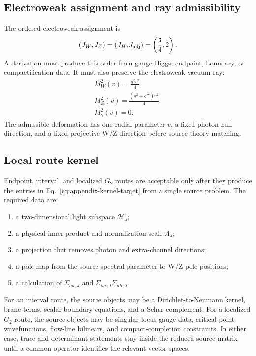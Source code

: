 \subsection{Electroweak assignment and ray admissibility}
\label{app:target-electroweak-assignment}
\label{app:target-electroweak-ray}

The ordered electroweak assignment is
\begin{equation}
  (J_W,J_Z)=(J_H,J_{\rm adj})=\left(\frac34,2\right).
  \label{eq:appendix-ew-assignment}
\end{equation}
A derivation must produce this order from gauge-Higgs, endpoint, boundary, or
compactification data.  It must also preserve the electroweak vacuum ray:
\begin{equation}
  \begin{gathered}
  M_W^2(v)=\frac{g^2v^2}{4},\\
  M_Z^2(v)=\frac{(g^2+g'^2)v^2}{4},\\
  M_\gamma^2(v)=0 .
  \end{gathered}
  \label{eq:appendix-ew-ray}
\end{equation}
The admissible deformation has one radial parameter \(v\), a fixed photon null
direction, and a fixed projective W/Z direction before source-theory matching.

\subsection{Local route kernel}
\label{app:target-boundary-determinant}
\label{app:target-g2-ade-pairing}

Endpoint, interval, and localized \(G_2\) routes are acceptable only after
they produce the entries in Eq.~\eqref{eq:appendix-kernel-target} from a
single source problem.  The required data are:
\begin{enumerate}
\item a two-dimensional light subspace \(\mathcal H_J\);
\item a physical inner product and normalization scale \(\Lambda_J\);
\item a projection that removes photon and extra-channel directions;
\item a pole map from the source spectral parameter to W/Z pole positions;
\item a calculation of \(\Sigma_{aa,J}\) and
\(\Sigma_{ha,J}\Sigma_{ah,J}\).
\end{enumerate}
For an interval route, the source objects may be a Dirichlet-to-Neumann kernel,
brane terms, scalar boundary equations, and a Schur complement.  For a
localized \(G_2\) route, the source objects may be singular-locus gauge data,
critical-point wavefunctions, flow-line bilinears, and compact-completion
constraints.  In either case, trace and determinant statements stay inside the
reduced source matrix until a common operator identifies the relevant vector
spaces.

